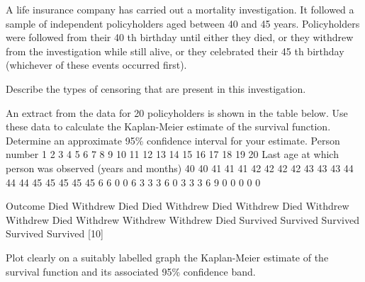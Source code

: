 \documentclass[a4paper,1pt]{article}
\begin{document}
A life insurance company has carried out a mortality investigation. It followed a
sample of independent policyholders aged between 40 and 45 years.
Policyholders were followed from their 40 th birthday until either they died, or
they withdrew from the investigation while still alive, or they celebrated their
45 th birthday (whichever of these events occurred first).
\item  Describe the types of censoring that are present in this investigation.
\item  An extract from the data for 20 policyholders is shown in the table below.
Use these data to calculate the Kaplan-Meier estimate of the survival
function. Determine an approximate 95\% confidence interval for your
estimate.
Person number
1
2
3
4
5
6
7
8
9
10
11
12
13
14
15
16
17
18
19
20
Last age at which person
was observed
(years and months)
40
40
41
41
41
42
42
42
42
43
43
43
44
44
44
45
45
45
45
45
6
6
0
0
6
3
3
3
6
0
3
3
3
6
9
0
0
0
0
0

Outcome
Died
Withdrew
Died
Died
Withdrew
Died
Withdrew
Died
Withdrew
Withdrew
Died
Withdrew
Withdrew
Withdrew
Died
Survived
Survived
Survived
Survived
Survived
[10]
\item 
Plot clearly on a suitably labelled graph the Kaplan-Meier estimate of the
survival function and its associated 95\% confidence band.
\end{document}
